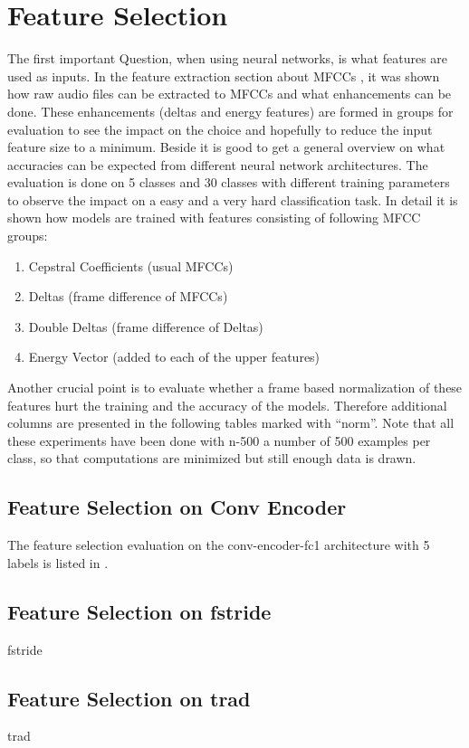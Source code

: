 
\section{Feature Selection}\label{sec:exp_fs}
\thesisStateNotReady
The first important Question, when using neural networks, is what features are used as inputs.
In the feature extraction section about MFCCs , it was shown how raw audio files can be extracted to MFCCs and what enhancements can be done.
These enhancements (deltas and energy features) are formed in groups for evaluation to see the impact on the choice and hopefully to reduce the input feature size to a minimum.
Beside it is good to get a general overview on what accuracies can be expected from different neural network architectures.
The evaluation is done on 5 classes and 30 classes with different training parameters to observe the impact on a easy and a very hard classification task.
In detail it is shown how models are trained with features consisting of following MFCC groups:
\begin{enumerate}
    \item Cepstral Coefficients (usual MFCCs)
    \item Deltas (frame difference of MFCCs)
    \item Double Deltas (frame difference of Deltas)
    \item Energy Vector (added to each of the upper features)
\end{enumerate}
Another crucial point is to evaluate whether a frame based normalization of these features hurt the training and the accuracy of the models.
Therefore additional columns are presented in the following tables marked with \enquote{norm}.
Note that all these experiments have been done with n-500 a number of 500 examples per class, so that computations are minimized but still enough data is drawn.

\subsection{Feature Selection on Conv Encoder}
The feature selection evaluation on the conv-encoder-fc1 architecture with 5 labels is listed in .
% 
% 
% 




\subsection{Feature Selection on fstride}
fstride


\subsection{Feature Selection on trad}
trad


